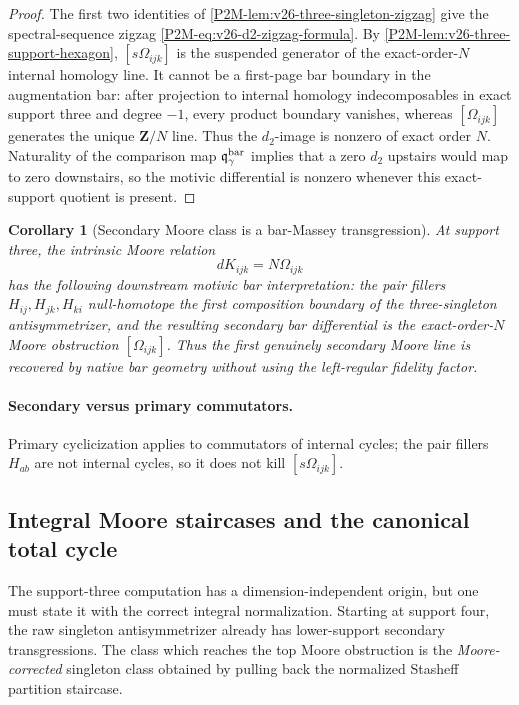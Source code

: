 \documentclass[11pt]{article}
\newtheorem{corollary}[theorem]{Corollary}
\theoremstyle{remark}
\newcommand{\Z}{\mathbf Z}
\begin{document}
\begin{proof}
The first two identities of
\cref{P2M-lem:v26-three-singleton-zigzag} give the spectral-sequence zigzag
\eqref{P2M-eq:v26-d2-zigzag-formula}.  By
\cref{P2M-lem:v26-three-support-hexagon},
\([s\Omega_{ijk}]\) is the suspended generator of the exact-order-\(N\)
internal homology line.  It cannot be a first-page bar boundary in the
augmentation bar: after projection to internal homology indecomposables in
exact support three and degree \(-1\), every product boundary vanishes,
whereas \([\Omega_{ijk}]\) generates the unique \(\Z/N\) line.
Thus the \(d_2\)-image is nonzero of exact order \(N\).
Naturality of the comparison map
\(\mathfrak q_\gamma^{\rm bar}\) implies that a zero \(d_2\) upstairs would
map to zero downstairs, so the motivic differential is nonzero whenever this
exact-support quotient is present.
\end{proof}

\begin{corollary}[Secondary Moore class is a bar-Massey transgression]
\label{P2M-cor:v26-moore-as-bar-massey}
At support three, the intrinsic Moore relation
\[
 dK_{ijk}=N\Omega_{ijk}
\]
has the following downstream motivic bar interpretation:
the pair fillers \(H_{ij},H_{jk},H_{ki}\) null-homotope the first composition
boundary of the three-singleton antisymmetrizer, and the resulting secondary
bar differential is the exact-order-\(N\) Moore obstruction
\([\Omega_{ijk}]\).
Thus the first genuinely secondary Moore line is recovered by native bar
geometry without using the left-regular fidelity factor.
\end{corollary}

\paragraph{Secondary versus primary commutators.}
Primary cyclicization applies to commutators of internal cycles; the pair
fillers \(H_{ab}\) are not internal cycles, so it does not kill
\([s\Omega_{ijk}]\).


\subsection{Integral Moore staircases and the canonical total cycle}


The support-three computation has a dimension-independent origin, but one must
state it with the correct integral normalization.  Starting at support four,
the raw singleton antisymmetrizer already has lower-support secondary
transgressions.  The class which reaches the top Moore obstruction is the
\emph{Moore-corrected} singleton class obtained by pulling back the normalized
Stasheff partition staircase.
\end{document}
